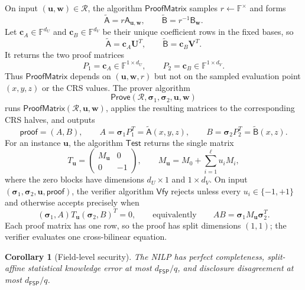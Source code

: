 \documentclass[11pt]{article}
\newtheorem{corollary}[theorem]{Corollary}
\theoremstyle{definition}
\newcommand{\F}{\mathbb F}
\newcommand{\cR}{\mathcal R}
\newcommand{\Prove}{\mathsf{Prove}}
\newcommand{\Vfy}{\mathsf{Vfy}}
\newcommand{\ProofObj}{\mathsf{proof}}
\newcommand{\FSP}{\mathsf{FSP}}
\newcommand{\ProofMatrix}{\mathsf{ProofMatrix}}
\newcommand{\Test}{\mathsf{Test}}
\begin{document}
On input $(\mathbf u,\mathbf w)\in\cR$, the algorithm $\ProofMatrix$ samples
$r\leftarrow\F^\times$ and forms
\begin{equation}
  \widetilde{\mathsf A}=r\mathsf A_{\mathbf u,\mathbf w},
  \qquad
  \widetilde{\mathsf B}=r^{-1}\mathsf B_{\mathbf w}.
  \label{eq:concrete-poly-randomization}
\end{equation}
Let $\mathbf c_A\in\F^{d_U}$ and $\mathbf c_B\in\F^{d_V}$ be their unique
coefficient rows in the fixed bases, so
\[
  \widetilde{\mathsf A}=\mathbf c_A\mathbf U^T,
  \qquad
  \widetilde{\mathsf B}=\mathbf c_B\mathbf V^T.
\]
It returns the two proof matrices
\[
  P_1=\mathbf c_A\in\F^{1\times d_U},
  \qquad
  P_2=\mathbf c_B\in\F^{1\times d_V}.
\]
Thus $\ProofMatrix$ depends on $(\mathbf u,\mathbf w,r)$ but not on the
sampled evaluation point $(x,y,z)$ or the CRS values.  The prover algorithm
\[
  \Prove(\cR,\boldsymbol{\sigma}_1,\boldsymbol{\sigma}_2,
         \mathbf u,\mathbf w)
\]
runs $\ProofMatrix(\cR,\mathbf u,\mathbf w)$, applies the resulting matrices
to the corresponding CRS halves, and outputs
\begin{equation}
  \ProofObj=(A,B),
  \qquad
  A=\boldsymbol{\sigma}_1P_1^T
   =\widetilde{\mathsf A}(x,y,z),
  \qquad
  B=\boldsymbol{\sigma}_2P_2^T
   =\widetilde{\mathsf B}(x,z).
  \label{eq:concrete-field-proof}
\end{equation}
For an instance $\mathbf u$, the algorithm $\Test$ returns the single matrix
\[
  T_{\mathbf u}
  =\begin{pmatrix}
     M_{\mathbf u} & 0\\
     0 & -1
  \end{pmatrix},
  \qquad
  M_{\mathbf u}=M_0+\sum_{i=1}^{\ell}u_iM_i,
\]
where the zero blocks have dimensions $d_U\times1$ and $1\times d_V$.
On input $(\boldsymbol{\sigma}_1,\boldsymbol{\sigma}_2,\mathbf u,
\ProofObj)$, the verifier algorithm $\Vfy$ rejects unless every
$u_i\in\{-1,+1\}$ and otherwise accepts precisely when
\begin{equation}
  (\boldsymbol{\sigma}_1,A)T_{\mathbf u}
  (\boldsymbol{\sigma}_2,B)^T=0,
  \qquad\text{equivalently}\qquad
  AB=\boldsymbol{\sigma}_1M_{\mathbf u}\boldsymbol{\sigma}_2^T.
  \label{eq:concrete-field-verifier}
\end{equation}
Each proof matrix has one row, so the proof has split dimensions $(1,1)$; the
verifier evaluates one cross-bilinear equation.

\begin{corollary}[Field-level security]
\label{cor:field-security}
The NILP has perfect completeness, split-affine statistical knowledge
error at most $d_{\FSP}/q$, and disclosure disagreement at most
$d_{\FSP}/q$.
\end{corollary}
\end{document}
